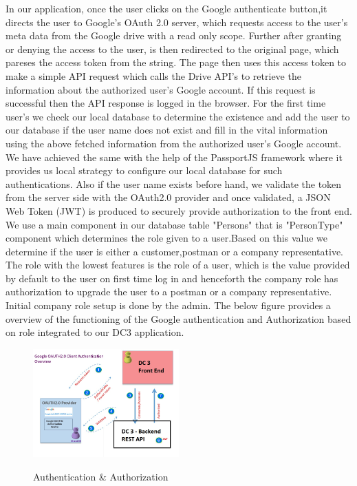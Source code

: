 In our application, once the user clicks on the Google authenticate button,it directs the user to Google's OAuth 2.0 server, which requests access to the user's meta data from the Google drive with a read only scope. Further after granting or denying the access to the user, is then redirected to the original page, which pareses the access token from the string. The page then uses this access token to make  a simple API request which calls the Drive API's to retrieve the information about the authorized user's Google account. If this request is successful then the API response is logged in the browser.
For the first time user's we check our local database to determine the existence and add the user to our database if the user name does not exist and fill in the vital information using the above fetched information from the authorized user's Google account. We have achieved the same with the help of the PassportJS framework where it provides us local strategy to configure our local database for such authentications. Also if the user name exists before hand, we validate the token from the server side with the OAuth2.0 provider and once validated, a JSON Web Token (JWT)  is produced to securely provide authorization to the front end.
We use a main component in our database table "Persons" that is "PersonType" component which determines the role given to a user.Based on this value we determine if the user is either a customer,postman or a company representative. The role with the lowest features is the role of a user, which is the value provided by default to the user on first time log in and henceforth the company role has  authorization to upgrade the user to a postman or a company representative. Initial company role setup is done by the admin. The below figure provides a overview of the functioning of the Google authentication and Authorization based on role integrated to our DC3 application.

\begin{figure}[!ht]
	\centering
	\includegraphics[width=0.5\textwidth]{images/GoogleAuth.jpeg}\\
	\caption{Authentication \& Authorization}
	\label{fig:Authentication and Authorization}
\end{figure}



